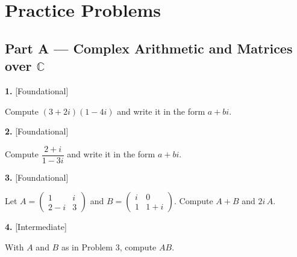 \documentclass[11pt]{article}
\begin{document}
\section*{\large\color{ink} Practice Problems}
\subsection*{\normalsize\color{ink} Part A --- Complex Arithmetic and Matrices over $\mathbb{C}$}
\begin{minipage}{\linewidth}\textbf{1.} \hfill{\scriptsize\color{ink}[Foundational]}\par\nopagebreak Compute $(3+2i)(1-4i)$ and write it in the form $a+bi$.
\vspace{2.2cm}\end{minipage}\par\vspace{4pt}
\begin{minipage}{\linewidth}\textbf{2.} \hfill{\scriptsize\color{ink}[Foundational]}\par\nopagebreak Compute $\dfrac{2+i}{1-3i}$ and write it in the form $a+bi$.
\vspace{2.6cm}\end{minipage}\par\vspace{4pt}
\begin{minipage}{\linewidth}\textbf{3.} \hfill{\scriptsize\color{ink}[Foundational]}\par\nopagebreak Let $A=\begin{pmatrix}1&i\\2-i&3\end{pmatrix}$ and $B=\begin{pmatrix}i&0\\1&1+i\end{pmatrix}$. Compute $A+B$ and $2i\,A$.
\vspace{3.4cm}\end{minipage}\par\vspace{4pt}
\begin{minipage}{\linewidth}\textbf{4.} \hfill{\scriptsize\color{ink}[Intermediate]}\par\nopagebreak With $A$ and $B$ as in Problem 3, compute $AB$.
\vspace{3.4cm}\end{minipage}\par\vspace{4pt}
\end{document}
